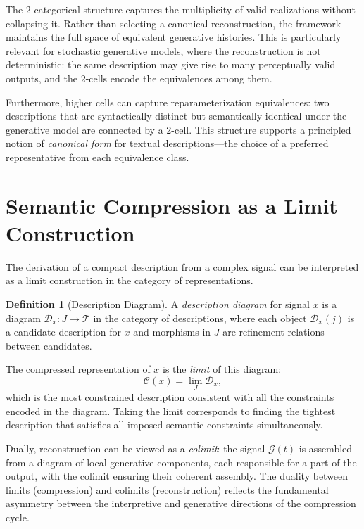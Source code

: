 \documentclass[12pt,a4paper]{article}
\theoremstyle{definition}
\newtheorem{definition}[theorem]{Definition}
\theoremstyle{remark}
\begin{document}
The 2-categorical structure captures the multiplicity of valid realizations without collapsing it. Rather than selecting a canonical reconstruction, the framework maintains the full space of equivalent generative histories. This is particularly relevant for stochastic generative models, where the reconstruction is not deterministic: the same description may give rise to many perceptually valid outputs, and the 2-cells encode the equivalences among them.

Furthermore, higher cells can capture reparameterization equivalences: two descriptions that are syntactically distinct but semantically identical under the generative model are connected by a 2-cell. This structure supports a principled notion of \emph{canonical form} for textual descriptions---the choice of a preferred representative from each equivalence class.

\section{Semantic Compression as a Limit Construction}
\label{sec:limits}

The derivation of a compact description from a complex signal can be interpreted as a limit construction in the category of representations.

\begin{definition}[Description Diagram]
A \emph{description diagram} for signal $x$ is a diagram $\mathcal{D}_x : J \rightarrow \mathcal{T}$ in the category of descriptions, where each object $\mathcal{D}_x(j)$ is a candidate description for $x$ and morphisms in $J$ are refinement relations between candidates.
\end{definition}

The compressed representation of $x$ is the \emph{limit} of this diagram:
\[
\mathcal{C}(x) = \lim_{J} \mathcal{D}_x,
\]
which is the most constrained description consistent with all the constraints encoded in the diagram. Taking the limit corresponds to finding the tightest description that satisfies all imposed semantic constraints simultaneously.

Dually, reconstruction can be viewed as a \emph{colimit}: the signal $\mathcal{G}(t)$ is assembled from a diagram of local generative components, each responsible for a part of the output, with the colimit ensuring their coherent assembly. The duality between limits (compression) and colimits (reconstruction) reflects the fundamental asymmetry between the interpretive and generative directions of the compression cycle.
\end{document}
